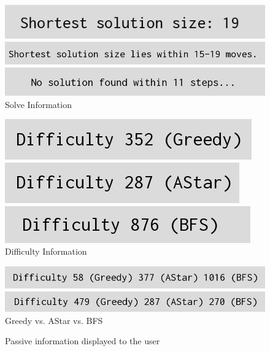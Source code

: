 \begin{figure}
\centering
\hfill
\begin{minipage}[t][5cm][b]{0.35\textwidth}
\centering
\includegraphics[width=1.0\linewidth]{figures/shortestsolution.png} \hfill
\includegraphics[width=1.0\linewidth]{figures/shortestsolutionwithin.png}\hfill
\includegraphics[width=1.0\linewidth]{figures/nosolutionwithin.png}\hfill
Solve Information
\label{fig:solveinformation}
\end{minipage}
\begin{minipage}[t][5cm][b]{0.25\textwidth}
\centering
\includegraphics[width=1.0\linewidth]{figures/difficultygreedy.png}\hfill
\includegraphics[width=1.0\linewidth]{figures/difficultyastar.png}\hfill
\includegraphics[width=1.0\linewidth]{figures/difficultybfs.png}\hfill
\label{fig:solveinformation}
Difficulty Information
\end{minipage}
\begin{minipage}[t][5cm][b]{0.35\textwidth}
\centering
\includegraphics[width=1.0\linewidth]{figures/difficultycurveleft.png} \hfill
\includegraphics[width=1.0\linewidth]{figures/difficultycurveright.png}\hfill
\label{fig:solveinformation}
Greedy vs. AStar vs. BFS
\end{minipage}


\caption{Passive information displayed to the user\label{fig:passiveinformation}}
\end{figure}


